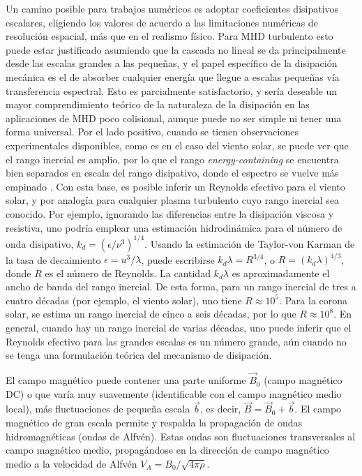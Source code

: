Un camino posible para trabajos numéricos es adoptar coeficientes
disipativos escalares, eligiendo los valores de acuerdo a las
limitaciones numéricas de resolución espacial, más que en el realismo
físico. Para MHD turbulento esto puede estar justificado asumiendo que
la cascada no lineal se da principalmente desde las escalas grandes a
las pequeñas, y el papel específico de la disipación mecánica es el de
absorber cualquier energía que llegue a escalas pequeñas vía
transferencia espectral. Esto es parcialmente satisfactorio, y sería
deseable un mayor comprendimiento teórico de la naturaleza de la
disipación en las aplicaciones de MHD poco colisional, aunque puede no
ser simple ni tener una forma universal. Por el lado positivo, cuando
se tienen observaciones experimentales disponibles, como es en el caso
del viento solar, se puede ver que el rango inercial es amplio, por lo
que el rango \textit{energy-containing} se encuentra bien separados en
escala del rango disipativo, donde el espectro se vuelve más empinado
\cite{leamon_observational_1998}. Con esta base, es posible inferir un
Reynolds efectivo para el viento solar, y por analogía para cualquier
plasma turbulento cuyo rango inercial sea conocido. Por ejemplo,
ignorando las diferencias entre la disipación viscosa y resistiva, uno
podría emplear una estimación hidrodinámica para el número de onda
disipativo, $k_d = \left(\epsilon/\nu^3\right)^{1/4}$. Usando la
estimación de Taylor-von Karman de la tasa de decaimiento $\epsilon =
u^3/\lambda$, puede escribirse $k_d \lambda = R^{3/4}$, o $R =
\left(k_d \lambda\right)^{4/3}$, donde $R$ es el número de
Reynolds. La cantidad $k_d \lambda$ es aproximadamente el ancho de
banda del rango inercial. De esta forma, para un rango inercial de
tres a cuatro décadas (por ejemplo, el viento solar), uno tiene $R
\approx 10^5$. Para la corona solar, se estima un rango inercial de
cinco a seis décadas, por lo que $R \approx 10^8$. En general, cuando
hay un rango inercial de varias décadas, uno puede inferir que el
Reynolds efectivo para las grandes escalas es un número grande, aún
cuando no se tenga una formulación teórica del mecanismo de
disipación.

El campo magnético puede contener una parte uniforme $\vec{B}_0$
(campo magnético DC) o que varía muy suavemente (identificable con el
campo magnético medio local), más fluctuaciones de pequeña escala
$\vec{b}$, es decir, $\vec{B} = \vec{B}_0 + \vec{b}$. El campo
magnético de gran escala permite y respalda la propagación de ondas
hidromagnéticas (ondas de Alfv\'en). Estas ondas son fluctuaciones
transversales al campo magnético medio, propagándose en la dirección
de campo magnético medio a la velocidad de Alfv\'en
$V_A = B_0/\sqrt{4\pi\rho}$.

